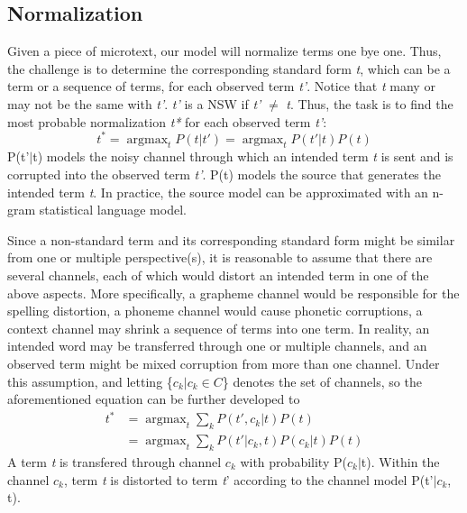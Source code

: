 \documentclass[letterpaper]{article}
\DeclareMathOperator*{\argmax}{argmax}
\begin{document}
\subsection{Normalization}
Given a piece of microtext, our model will normalize terms one bye one. Thus, the challenge is to determine the corresponding standard form \textit{t}, which can be a term or a sequence of terms, for each observed term \textit{t'}. Notice that \textit{t} many or may not be the same with \textit{t'}. \textit{t'} is a NSW if \textit{t'} $\neq$ \textit{t}. Thus, the task is to find the most probable normalization \textit{t*} for each observed term \textit{t'}:
\begin{equation}\label{key}
t^{*}=\mathop{\argmax}_{t}P(t|t')=\mathop{\argmax}_{t}P(t'|t)P(t)
\end{equation}
P(t'$|$t) models the noisy channel through which an intended term \textit{t} is sent and is corrupted into the observed term \textit{t'}. P(t) models the source that generates the intended term \textit{t}. In practice, the source model can be approximated with an n-gram statistical language model.

Since a non-standard term and its corresponding standard form might be similar from one or multiple perspective(s), it is reasonable to assume that there are several channels, each of which would distort an intended term in one of the above aspects. More specifically, a grapheme channel would be responsible for the spelling distortion, a phoneme channel would cause phonetic corruptions, a context channel may shrink a sequence of terms into one term. In reality, an intended word may be transferred through one or multiple channels, and an observed term might be mixed corruption from more than one channel. Under this assumption, and letting \{\textit{$c_{k}$}$|$\textit{$c_{k} \in C$}\} denotes the set of channels, so the aforementioned equation can be further developed to 
\begin{equation}\label{key}
\begin{aligned}
t^{*}&= \mathop{\argmax}_{t}\sum_{k}P(t',c_{k}|t)P(t) \\
  &= \mathop{\argmax}_{t}\sum_{k}P(t'|c_{k},t)P(c_{k}|t)P(t)
\end{aligned}
\end{equation}
A term \textit{t} is transfered through channel \textit{$c_{k}$} with probability P($c_{k}|$t). Within the channel \textit{$c_{k}$}, term \textit{t} is distorted to term \textit{t}' according to the channel model P(t'$|c_{k}$, t).
\end{document}
